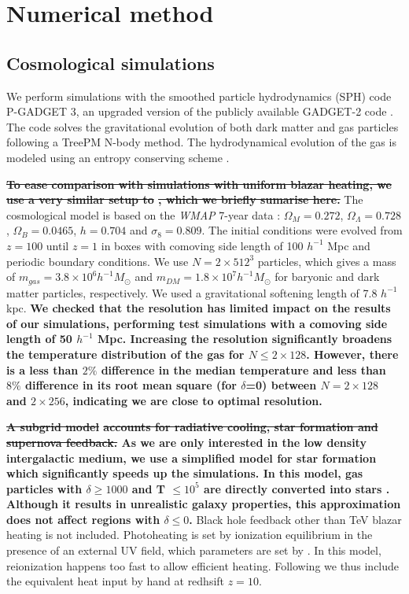 \documentclass[twocolumns]{emulateapj}
\newcommand\ALc[1]{{\color{red} \bf #1}} %
\begin{document}
{%
 


\section{Numerical method}
\subsection{Cosmological simulations}
We perform simulations with the smoothed particle hydrodynamics (SPH)  code \textsc{P-GADGET 3}, an upgraded version of the publicly available \textsc{GADGET-2} code \citep{2005MNRAS.364.1105S}. The code solves the gravitational evolution of both dark matter and gas particles following a TreePM N-body method. The hydrodynamical evolution of the gas is modeled using an entropy conserving scheme \citep{2002MNRAS.333..649S}.

\ALc{\sout{To ease comparison with simulations with uniform blazar heating, we use a very similar setup to }\citet{2012MNRAS.423..149P}\sout{, which we briefly sumarise here. }}
The cosmological model is based on the \textit{WMAP} 7-year data \citep{2011ApJS..192...18K}: $\Omega_M=0.272$, $\Omega_{\Lambda}=0.728$, $\Omega_{B}= 0.0465$, $h=0.704$ and $\sigma_8=0.809$. The initial conditions were evolved from $z=100$ until $z=1$ in boxes with  comoving side length of 100 $h^{-1}$ Mpc and periodic boundary conditions. We use $N= 2\times 512^3$ particles, which gives a mass of $m_{gas}=3.8\times10^{6} h^{-1} M_{\odot}$ and $m_{DM}=1.8\times 10^{7} h^{-1} M_{\odot}$ for baryonic and dark matter particles, respectively. We used  a gravitational softening length of 7.8 $h^{-1}$ kpc.  \ALc{We checked that the resolution has limited impact on the results of our simulations, performing test simulations with a comoving side length of  50 $h^{-1}$ Mpc.  Increasing the resolution significantly broadens  the temperature distribution of the gas for $N\leqslant 2\times 128$. However, there is a less than $2\%$ difference in the median temperature and less than $8\%$ difference in its root mean square (for $\delta$=0) between $N=2\times 128$ and $2\times 256$, indicating we are close to optimal resolution. }

\ALc{\sout{A subgrid model} \citep{2003MNRAS.339..289S} \sout{accounts for radiative cooling, star formation and supernova feedback.} As we are only interested in the low density intergalactic medium, we use a simplified model for star formation which significantly speeds up the simulations. In this model, gas particles with $\delta\geq 1000$ and T $\leq 10^5$ are directly converted into stars \citep{2004MNRAS.354..684V}. Although it results in unrealistic galaxy properties, this approximation does not affect regions with $\delta \leq 0$.}  Black hole feedback other than TeV blazar heating is not included. Photoheating is set by ionization equilibrium in the presence of an external UV field, which parameters are set by \citet{2009ApJ...703.1416F}. In this model, reionization happens too fast to allow efficient heating. Following \citet{2012MNRAS.423..149P} we thus include the equivalent heat input by hand at redhsift $z=10$.


}
\end{document}
